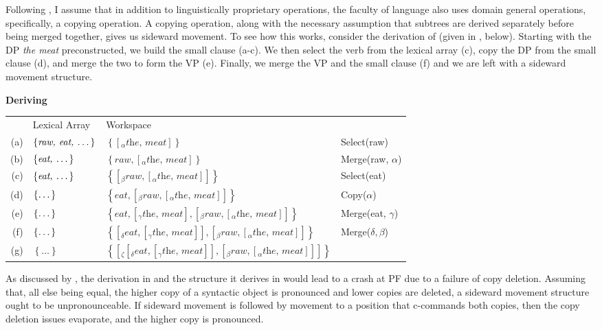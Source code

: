 \documentclass[letterpaper,12pt]{article}
\newcommand{\figex}{\refstepcounter{ExNo}\theExNo\hspace{\Exlabelsep}}
\begin{document}
Following \textcite{hornstein2009theory,nunes2001sideward}, I assume that in addition to linguistically proprietary operations, the faculty of language also uses domain general operations, specifically, a copying operation.
A copying operation, along with the necessary assumption that subtrees are derived separately before being merged together, gives us sideward movement.
To see how this works, consider the derivation of \Last (given in \Next, below).
Starting with the DP \textit{the meat} preconstructed, we build the small clause (a-c).
We then select the verb from the lexical array (c), copy the DP from the small clause (d), and merge the two to form the VP (e).
Finally, we merge the VP and the small clause (f) and we are left with a sideward movement structure.
\begin{table}
  \figex \textbf{Deriving \LLast}\\
  {\small
\begin{tabular}[t]{rlll}
  & Lexical Array & Workspace\\
  (a) & 
  $\left\{ \textit{raw, eat, \dots} \right\}$ &
  $\left\{ \left[_\alpha \textit{the, meat} \right] \right\}$ &
  Select(raw)\\
  (b) &
  $\left\{ \textit{eat, \dots} \right\}$ &
  $\left\{ \textit{raw}, \left[_\alpha\textit{the, meat}\right] \right\}$ &
  Merge(raw, $\alpha$)\\
  (c) &
  $\left\{  \textit{eat, \dots}\right\}$ &
  $\left\{ \left[_\beta \textit{raw}, \left[_\alpha\textit{the, meat}\right] \right] \right\}$ &
  Select(eat)\\
  (d) &
  $\left\{ \textit{\dots} \right\}$ &
  $\left\{ \textit{eat}, \left[_\beta \textit{raw}, \left[_\alpha\textit{the, meat}\right] \right] \right\}$ &
  Copy($\alpha$)\\
  (e) &
  $\left\{ \textit{\dots} \right\}$ &
  $\left\{ \textit{eat}, \left[_\gamma\textit{the, meat}\right], \left[_\beta \textit{raw}, \left[_\alpha\textit{the, meat}\right] \right] \right\}$ &
  Merge(eat,  $\gamma$)\\
  (f) &
  $\left\{ \textit{\dots} \right\}$ &
  $\left\{ \left[_\delta\textit{eat}, \left[_\gamma\textit{the, meat}\right]\right], \left[_\beta \textit{raw}, \left[_\alpha\textit{the, meat}\right] \right] \right\}$ &
  Merge($\delta, \beta$)\\
  (g) &
  $\left\{ \ldots \right\}$ &
  $\left\{  \left[ _\zeta \left[_\delta\textit{eat}, \left[_\gamma\textit{the, meat}\right]\right], \left[_\beta \textit{raw}, \left[_\alpha\textit{the, meat}\right] \right] \right]\right\}$ &
  \\
\end{tabular}}
\end{table}
As discussed by \textcite{nunes2001sideward}, the derivation in \Last and the structure it derives in \LLast would lead to a crash at PF due to a failure of copy deletion.
Assuming that, all else being equal, the higher copy of a syntactic object is pronounced and lower copies are deleted, a sideward movement structure ought to be unpronounceable.
If sideward movement is followed by movement to a position that c-commands both copies, then the copy deletion issues evaporate, and the higher copy is pronounced.
\end{document}
